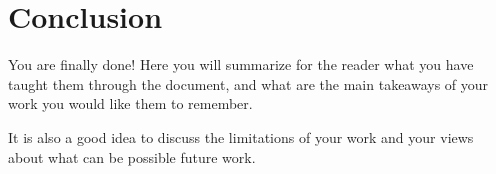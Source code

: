 \chapter{Conclusion}
\label{sec:conclusion}

You are finally done! Here you will summarize for the reader what you have taught them through
the document, and what are the main takeaways of your work you would like them to remember.

It is also a good idea to discuss the limitations of your work and your views about what can be
possible future work.